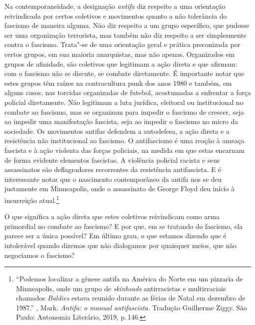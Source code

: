 Na contemporaneidade, a designação \emph{antifa} diz respeito a uma
orientação reivindicada por certos coletivos e movimentos quanto a não
tolerância do fascismo de maneira alguma. Não diz respeito a um grupo
específico, que pudesse ser uma organização terrorista, mas também não
diz respeito a ser simplesmente contra o fascismo. Trata"-se de uma
orientação geral e prática preconizada por certos grupos, em sua maioria
anarquistas, mas não apenas. Organizados em grupos de
afinidade, são coletivos que legitimam a ação direta e que
afirmam: com o fascismo não se discute, se combate diretamente. É
importante notar que estes grupos têm raízes na contracultura punk dos
anos 1980 e também, em alguns casos, nas torcidas organizadas de futebol,
acostumadas a enfrentar a força policial diretamente. Não legitimam a
luta jurídica, eleitoral ou institucional no combate ao fascismo, mas
se organizam para impedir o fascismo de crescer, seja ao impedir
uma manifestação fascista, seja ao impedir o fascismo no micro da
sociedade. Os movimentos antifas defendem a
autodefesa, a ação direta e a resistência não institucional ao
fascismo. O antifascismo é uma reação à ameaça fascista e à
ação violenta das forças policiais, na medida em que estas encarnam de
forma evidente elementos fascistas. A violência policial racista e seus
assassinatos são deflagradores recorrentes da resistência antifascista.
E é interessante notar que o nascimento contemporâneo da antifa
nos  se deu justamente em Minneapolis, onde o assassinato de George
Floyd deu início à insurreição atual.\footnote{``Podemos localizar a
  gênese antifa na América do Norte em um pizzaria de Minneapolis, onde
  um grupo de \emph{skinheads} antirracistas e multirraciais chamados \emph{Baldies}
  estava reunido durante as férias de Natal em dezembro de 1987.'' ,
  Mark. \emph{Antifa: o manual antifascista}. Tradução Guilherme Ziggy. São
  Paulo: Autonomia Literário, 2019, p.\,146.}

O que significa a ação direta que estes coletivos reivindicam como arma
primordial no combate ao fascismo? E por que, em se tratando do
fascismo, ela parece ser a única possível? Em último grau, o que estamos
dizendo que é intolerável quando dizemos que não dialogamos por
quaisquer meios, que não negociamos o fascismo?

